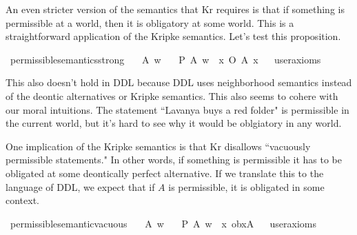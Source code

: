 \begin{isabellebody}
\begin{isamarkuptext}
An even stricter version of the semantics that Kr requires is that if something is permissible at a world, 
then it is obligatory at some world. This is a straightforward application of the Kripke semantics. Let's
test this proposition.%
\end{isamarkuptext}\isamarkuptrue%
\isamarkupfalse%
\ permissible{\isacharunderscore}semantics{\isacharunderscore}strong{\isacharcolon}\isanewline
\ \ \ A\ w\isanewline
\ \ \ {\isachardoublequoteopen}P\ {\isacharbraceleft}A{\isacharbraceright}\ w\ {\isasymlongrightarrow}\ {\isacharparenleft}{\isasymexists}x{\isachardot}\ O\ {\isacharbraceleft}A{\isacharbraceright}\ x{\isacharparenright}{\isachardoublequoteclose}\isanewline
\ \ \isamarkupfalse%
{\isacharbrackleft}user{\isacharunderscore}axioms{\isacharbrackright}%
\isadelimproof
\ %
\endisadelimproof
%
\isatagproof
{}\isamarkupfalse%
\isanewline
%
%
\endisatagproof
{\isafoldproof}%
%
\isadelimproof
%
\endisadelimproof
%
\begin{isamarkuptext}%
This also doesn't hold in DDL because DDL uses neighborhood semantics instead of the deontic 
alternatives or Kripke semantics. This also seems to cohere with our moral intuitions. The statement 
``Lavanya buys a red folder" is permissible in the current world, but it's hard to see why it would 
be oblgiatory in any world.

One implication of the Kripke semantics is that Kr disallows ``vacuously permissible statements." In 
other words, if something is permissible it has to be obligated at some deontically perfect alternative. 
If we translate this to the language of DDL, we expect that if $A$ is permissible, it is obligated in some 
context.%
\end{isamarkuptext}\isamarkuptrue%
\isamarkupfalse%
\ permissible{\isacharunderscore}semantic{\isacharunderscore}vacuous{\isacharcolon}\isanewline
\ \ \ A\ w\isanewline
\ \ \ {\isachardoublequoteopen}P\ {\isacharbraceleft}A{\isacharbraceright}\ w\ {\isasymlongrightarrow}\ {\isacharparenleft}{\isasymexists}x{\isachardot}\ ob{\isacharparenleft}x{\isacharparenright}{\isacharparenleft}A{\isacharparenright}{\isacharparenright}{\isachardoublequoteclose}\isanewline
\ \ \isamarkupfalse%
{\isacharbrackleft}user{\isacharunderscore}axioms{\isacharbrackright}%
\isadelimproof
\ %
\endisadelimproof
%
\isatagproof
{}\isamarkupfalse%
\isanewline
%
\end{isabellebody}
